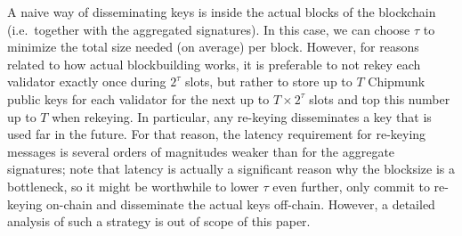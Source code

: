 A naive way of disseminating keys is inside the actual blocks of the blockchain (i.e.\ together with the aggregated signatures).
In this case, we can choose $\tau$ to minimize the total size needed (on average) per block.
However, for reasons related to how actual blockbuilding works, it is preferable to not rekey each validator exactly once during $2^\tau$ slots, but rather to store up to $T$ Chipmunk public keys for each validator for the next up to $T\times 2^\tau$ slots and top this number up to $T$ when rekeying.
In particular, any re-keying disseminates a key that is used far in the future.
For that reason, the latency requirement for re-keying messages is several orders of magnitudes weaker than for the aggregate signatures;
note that latency is actually a significant reason why the blocksize is a bottleneck, so it might be worthwhile to lower $\tau$ even further, only commit to re-keying on-chain and disseminate the actual keys off-chain.
However, a detailed analysis of such a strategy is out of scope of this paper.
